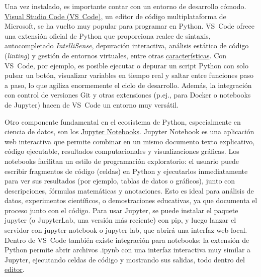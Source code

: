 Una vez instalado, es importante contar con un entorno de desarrollo cómodo. \href{https://code.visualstudio.com/}{Visual Studio Code (VS Code)}, 
un editor de código multiplataforma de Microsoft, se ha vuelto muy popular para programar en Python. VS Code ofrece una extensión oficial de Python 
que proporciona realce de sintaxis, autocompletado \textit{IntelliSense}, depuración interactiva, análisis estático de código (\textit{linting}) 
y gestión de entornos virtuales, entre otras \href{https://code.visualstudio.com/docs/languages/python#:~:text=Working%20with%20Python%20in%20Visual,including%20virtual%20and%20conda%20environments}{características}.
Con VS Code, por ejemplo, es posible ejecutar o depurar un script Python con solo pulsar un botón, visualizar variables en tiempo real y saltar entre
 funciones paso a paso, lo que agiliza enormemente el ciclo de desarrollo. Además, la integración con control de versiones Git y otras extensiones 
 (p.ej., para Docker o notebooks de Jupyter) hacen de VS Code un entorno muy versátil.

Otro componente fundamental en el ecosistema de Python, especialmente en ciencia de datos, son los \href{https://code.visualstudio.com/docs/datascience/jupyter-notebooks#:~:text=Jupyter%20Notebooks%20in%20VS%20Code,on%20one%20canvas%20called}
{Jupyter Notebooks}. Jupyter Notebook es una aplicación web interactiva que permite combinar en un mismo documento texto explicativo, 
código ejecutable, resultados computacionales y visualizaciones gráficas. Los notebooks facilitan un estilo de programación exploratorio: 
el usuario puede escribir fragmentos de código (celdas) en Python y ejecutarlos inmediatamente para ver sus resultados (por ejemplo, tablas de datos 
o gráficos), junto con descripciones, fórmulas matemáticas y anotaciones. 
Esto es ideal para análisis de datos, experimentos científicos, o demostraciones educativas, ya que documenta el proceso junto con el código. 
Para usar Jupyter, se puede instalar el paquete jupyter (o JupyterLab, una versión más reciente) con pip, y luego lanzar el servidor con jupyter 
notebook o jupyter lab, que abrirá una interfaz web local. Dentro de VS Code también existe integración para notebooks: la extensión de Python permite 
abrir archivos .ipynb con una interfaz interactiva muy similar a Jupyter, ejecutando celdas de código y mostrando sus salidas, todo dentro del \href{https://code.visualstudio.com/docs/datascience/jupyter-notebooks#:~:text=Jupyter%20Notebooks%20in%20VS%20Code,on%20one%20canvas%20called}{editor}.

